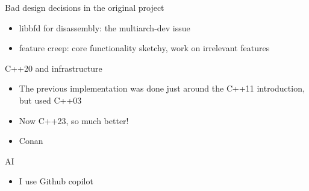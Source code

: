 \documentclass{beamer}
\begin{document}
\begin{frame}{Bad design decisions in the original project}
  \begin{itemize}
    \item libbfd for disassembly: the multiarch-dev issue
    \item feature creep: core functionality sketchy, work on irrelevant features
  \end{itemize}

\end{frame}

\begin{frame}{C++20 and infrastructure}
  \begin{itemize}
    \item The previous implementation was done just around the C++11 introduction, but used C++03
    \item Now C++23, so much better!
    \item Conan




  \end{itemize}
\end{frame}

\begin{frame}{AI}
  \begin{itemize}
    \item I use Github copilot
  \end{itemize}

\end{frame}
\end{document}

